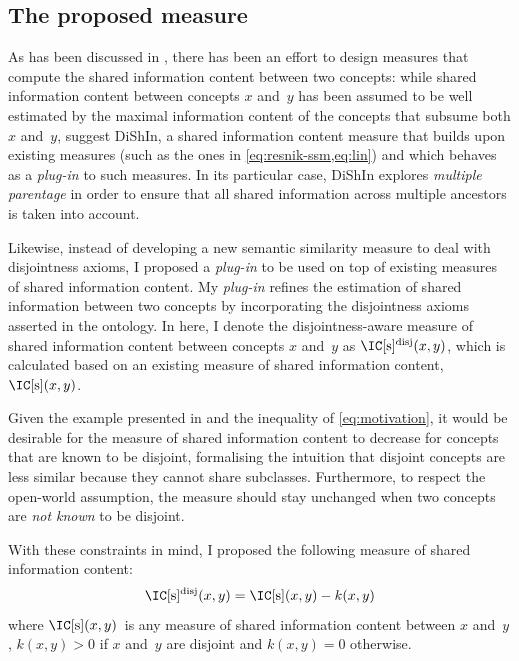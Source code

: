 \subsection{The proposed measure} \label{sub:disjointness/measure}

As has been discussed in , there has been an effort to design measures that compute the shared information content between two concepts: while shared information content between concepts $x$ and~$y$ has been assumed to be well estimated by the maximal information content of the concepts that subsume both $x$ and~$y$, \citet{Couto2011} suggest DiShIn, a shared information content measure that builds upon existing measures (such as the ones in \eqref{eq:resnik-ssm,eq:lin}) and which behaves as a \emph{plug-in} to such measures. In its particular case, DiShIn explores \emph{multiple parentage} in order to ensure that all shared information across multiple ancestors is taken into account.

Likewise, instead of developing a new semantic similarity measure to deal with disjointness axioms, I proposed a \emph{plug-in} to be used on top of existing measures of shared information content. My \emph{plug-in} refines the estimation of shared information between two concepts by incorporating the disjointness axioms asserted in the ontology. In here, I denote the disjointness-aware measure of shared information content between concepts $x$ and~$y$ as $\ICsdis(x,y)$, which is calculated based on an existing measure of shared information content,~$\ICs(x,y)$.

Given the example presented in  and the inequality of \eqref{eq:motivation}, it would be desirable for the measure of shared information content to decrease for concepts that are known to be disjoint, formalising the intuition that disjoint concepts are less similar because they cannot share subclasses. Furthermore, to respect the open-world assumption, the measure should stay unchanged when two concepts are \emph{not known} to be disjoint.

With these constraints in mind, I proposed the following measure of shared information content:
\begin{equation}
    \ICsdis(x,y) = \ICs(x,y) - k(x,y)
    \label{eq:new-disj}
\end{equation}
where $\ICs(x,y)$~is any measure of shared information content between $x$ and~$y$, $k(x, y) > 0$ if $x$ and~$y$ are disjoint and $k(x, y) = 0$ otherwise.

